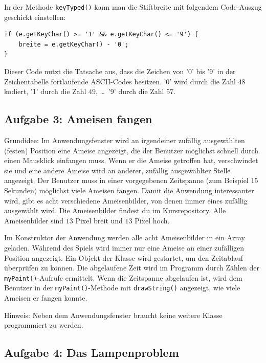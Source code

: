 \begin{compactenum}[a)]
In der Methode \lstinline|keyTyped()| kann man die Stiftbreite mit folgendem
Code-Auszug geschickt einstellen:

\begin{lstlisting}
if (e.getKeyChar() >= '1' && e.getKeyChar() <= '9') {
    breite = e.getKeyChar() - '0';
}
\end{lstlisting}

Dieser Code nutzt die Tatsache aus, dass die Zeichen von '0' bis '9' in der
Zeichentabelle fortlaufende ASCII-Codes besitzen. '0' wird durch die Zahl $48$
kodiert, '1' durch die Zahl $49$, \ldots\ '9' durch die Zahl $57$.
\end{compactenum}


\subsection{Aufgabe 3: Ameisen fangen}

Grundidee: Im Anwendungsfenster wird an irgendeiner zufällig ausgewählten
(festen) Position eine Ameise angezeigt, die der Benutzer möglichst schnell
durch einen Mausklick einfangen muss. Wenn er die Ameise getroffen hat,
verschwindet sie und eine andere Ameise wird an anderer, zufällig ausgewählter
Stelle angezeigt. Der Benutzer muss in einer vorgegebenen Zeitspanne (zum
Beispiel $15$ Sekunden) möglichst viele Ameisen fangen. Damit die Anwendung
interessanter wird, gibt es acht verschiedene Ameisenbilder, von denen immer
eines zufällig ausgewählt wird. Die Ameisenbilder findest du im Kursrepository.
Alle Ameisenbilder sind $13$ Pixel breit und $13$ Pixel hoch.

Im Konstruktor der Anwendung werden alle acht Ameisenbilder in ein Array
geladen. Während des Spiels wird immer nur eine Ameise an einer zufälligen
Position angezeigt. Ein Objekt der Klasse  wird gestartet, um den
Zeitablauf überprüfen zu können. Die abgelaufene Zeit wird im Programm durch
Zählen der \lstinline|myPaint()|-Aufrufe ermittelt. Wenn die Zeitspanne
abgelaufen ist, wird dem Benutzer in der \lstinline|myPaint()|-Methode mit
\lstinline|drawString()| angezeigt, wie viele Ameisen er fangen konnte.

Hinweis: Neben dem Anwendungsfenster braucht keine weitere Klasse programmiert
zu werden.


\subsection{Aufgabe 4: Das Lampenproblem}

